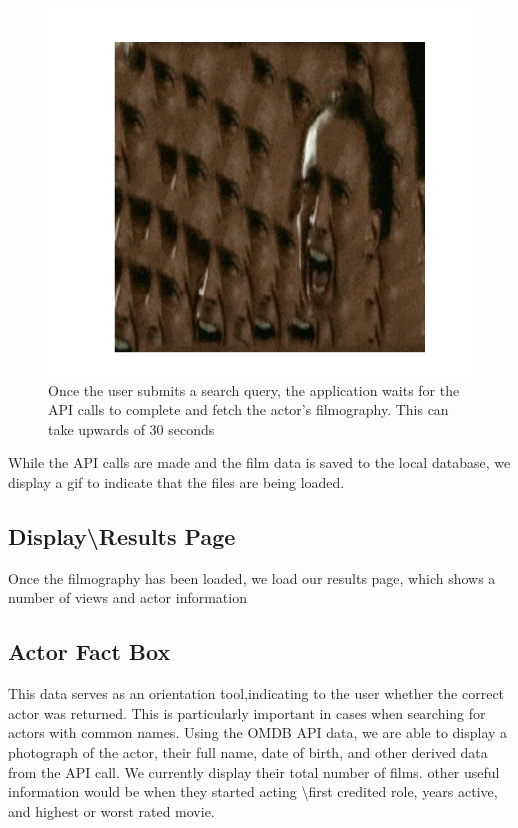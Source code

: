 \documentclass[12pt]{article}
\begin{document}
			\begin{figure}[h!]
				\centering
				\includegraphics[scale=0.3]{images/loadingPage.png}
				\caption{Once the user submits a search query, the application waits for the API calls to complete and fetch the actor's filmography.  This can take upwards of 30 seconds}
			\end{figure}
			While the API calls are made and the film data is saved to the local database, we display a gif to indicate that the files are being loaded.

\subsection{Display\textbackslash Results Page}
Once the filmography has been loaded, we load our results page, which  shows a number of views and actor information

\subsection{Actor Fact Box}

	This data serves as an orientation tool,indicating to the user whether the correct actor was returned.  This is particularly important in cases when searching for actors with common names.  Using the OMDB API data, we are able to display a photograph of the actor, their full name, date of birth, and other derived data from the API call.  We currently display their total number of films.  other useful information would be when they started acting \textbackslash first credited role, years active, and highest or worst rated movie.
	
\end{document}
